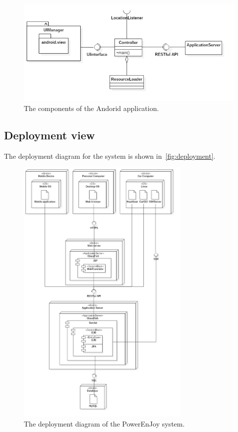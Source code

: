 \begin{figure}[H]
    \centering
    \includegraphics[width=\textwidth, keepaspectratio]{diagrams/Android.png}
    \caption{The components of the Andorid application.}
    \label{fig:android-app}
\end{figure}

\subsection{Deployment view}

The deployment diagram for the system is shown in~\autoref{fig:deployment}.

\begin{figure}[H]
	\centering
	\includegraphics[height=500px, keepaspectratio]{diagrams/Deployment.png}
	\caption{The deployment diagram of the PowerEnJoy system.}
	\label {fig:deployment}
\end{figure}

